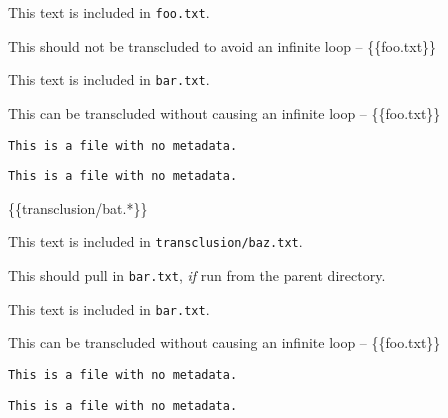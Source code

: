 
\def\mytitle{Transclusion}


This text is included in \texttt{foo.txt}.

This should not be transcluded to avoid an infinite loop -- \{\{foo.txt\}\}

This text is included in \texttt{bar.txt}.

This can be transcluded without causing an infinite loop -- \{\{foo.txt\}\}

\begin{verbatim}
This is a file with no metadata.
\end{verbatim}

\begin{verbatim}
This is a file with no metadata.
\end{verbatim}

\{\{transclusion\slash bat.*\}\}

This text is included in \texttt{transclusion\slash baz.txt}.

This should pull in \texttt{bar.txt}, \emph{if} run from the parent directory.

This text is included in \texttt{bar.txt}.

This can be transcluded without causing an infinite loop -- \{\{foo.txt\}\}

\begin{verbatim}
This is a file with no metadata.
\end{verbatim}

\begin{verbatim}
This is a file with no metadata.
\end{verbatim}



